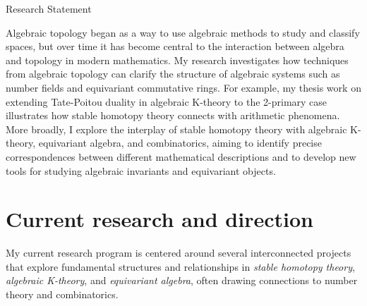 \documentclass[11pt]{article}
\begin{document}
\begin{center}\LARGE{Research Statement}
\end{center}
Algebraic topology began as a way to use algebraic methods to study and classify spaces, but over time it has become central to the interaction between algebra and topology in modern mathematics.
My research investigates how techniques from algebraic topology can clarify the structure of algebraic systems such as number fields and equivariant commutative rings.
For example, my thesis work on extending Tate-Poitou duality in algebraic K-theory to the 2-primary case illustrates how stable homotopy theory connects with arithmetic phenomena.
More broadly, I explore the interplay of stable homotopy theory with algebraic K-theory, equivariant algebra, and combinatorics, aiming to identify precise correspondences between different mathematical descriptions and to develop new tools for studying algebraic invariants and equivariant objects.

\section{Current research and direction}

My current research program is centered around several interconnected projects that explore fundamental structures and relationships in {\it stable homotopy theory}, {\it algebraic K-theory}, and {\it equivariant algebra}, often drawing connections to number theory and combinatorics.
\end{document}
